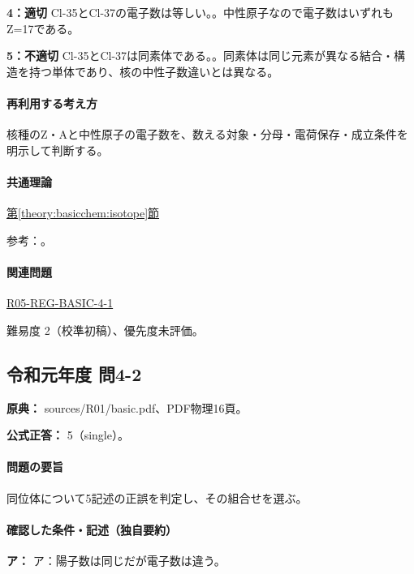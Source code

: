 \noindent\textbf{4：適切} Cl-35とCl-37の電子数は等しい。。中性原子なので電子数はいずれもZ=\allowbreak{}17である。\par

\noindent\textbf{5：不適切} Cl-35とCl-37は同素体である。。同素体は同じ元素が異なる結合・構造を持つ単体であり、核の中性子数違いとは異なる。\par

\paragraph{再利用する考え方} 核種のZ・Aと中性原子の電子数を、数える対象・分母・電荷保存・成立条件を明示して判断する。

\paragraph{共通理論} \hyperref[theory:basicchem:isotope]{第\ref*{theory:basicchem:isotope}節}

\par 参考：\cite{iupac_isotopes}。

\paragraph{関連問題} \hyperref[q:r05-reg-basic-4-1]{R05-REG-BASIC-4-1}

\par 難易度 2（校準初稿）、優先度未評価。

\subsection{令和元年度 問4-2}
\label{q:r01-reg-basic-4-2}

\noindent\textbf{原典：} sources/R01/basic.pdf、PDF物理16頁。

\textbf{公式正答：} 5（single）。

\paragraph{問題の要旨} 同位体について5記述の正誤を判定し、その組合せを選ぶ。

\paragraph{確認した条件・記述（独自要約）}\mbox{}\par

\noindent\textbf{ア：} ア：陽子数は同じだが電子数は違う。\par

